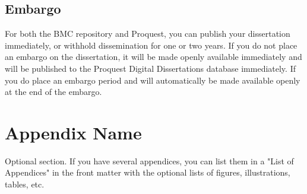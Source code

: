 \documentclass[12pt]{report}
\begin{document}
\section{Embargo}
For both the BMC repository and Proquest, you can publish your dissertation immediately, or withhold dissemination for one or two years. If you do not place an embargo on the dissertation, it will be made openly available immediately and will be published to the Proquest Digital Dissertations database immediately. If you do place an embargo period and will automatically be made available openly at the end of the embargo. 

\appendix
\chapter{Appendix Name}
Optional section. If you have several appendices, you can list them in a "List of Appendices" in the front matter with the optional lists of figures, illustrations, tables, etc.

\singlespacing
\printbibliography[heading=bibintoc, title={Bibliography}]
\end{document}

